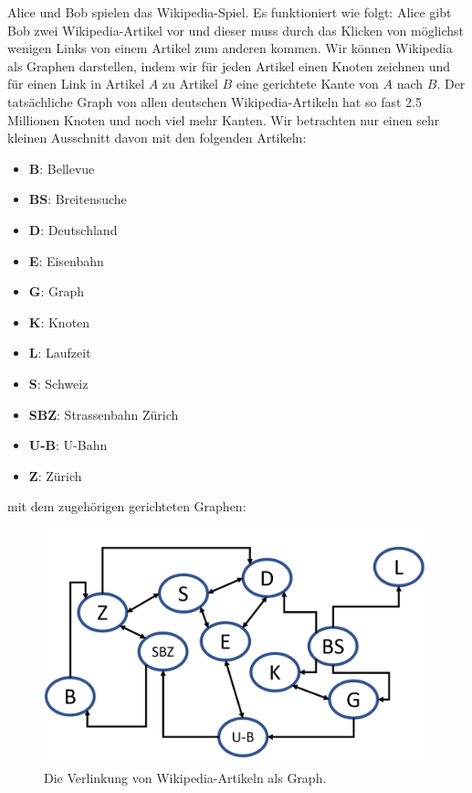 Alice und Bob spielen das Wikipedia-Spiel. Es funktioniert wie folgt: Alice gibt Bob zwei Wikipedia-Artikel vor und dieser muss durch das Klicken von möglichst wenigen Links von einem Artikel zum anderen kommen. Wir können Wikipedia als Graphen darstellen, indem wir für jeden Artikel einen Knoten zeichnen und für einen Link in Artikel $A$ zu Artikel $B$ eine gerichtete Kante von $A$ nach $B$. Der tatsächliche Graph von allen deutschen Wikipedia-Artikeln hat so fast 2.5 Millionen Knoten und noch viel mehr Kanten. Wir betrachten nur einen sehr kleinen Ausschnitt davon mit den folgenden Artikeln:
\begin{multicols}{2}
\begin{itemize}
    \item {\bf{B}}: Bellevue
    \item {\bf{BS}}: Breitensuche
    \item {\bf{D}}: Deutschland
    \item {\bf{E}}: Eisenbahn
    \item {\bf{G}}: Graph
    \item {\bf{K}}: Knoten
    \item {\bf{L}}: Laufzeit
    \item {\bf{S}}: Schweiz
    \item {\bf{SBZ}}: Strassenbahn Zürich
    \item {\bf{U-B}}: U-Bahn
    \item {\bf{Z}}: Zürich
\end{itemize}

\end{multicols}
mit dem zugehörigen gerichteten Graphen:
\begin{figure}[h!]
    \centering
    \includegraphics[scale=0.5]{Pictures/Wikipedia.PNG} 
    \caption{Die Verlinkung von Wikipedia-Artikeln als Graph.}
    \label{fig:my_label}
\end{figure}

